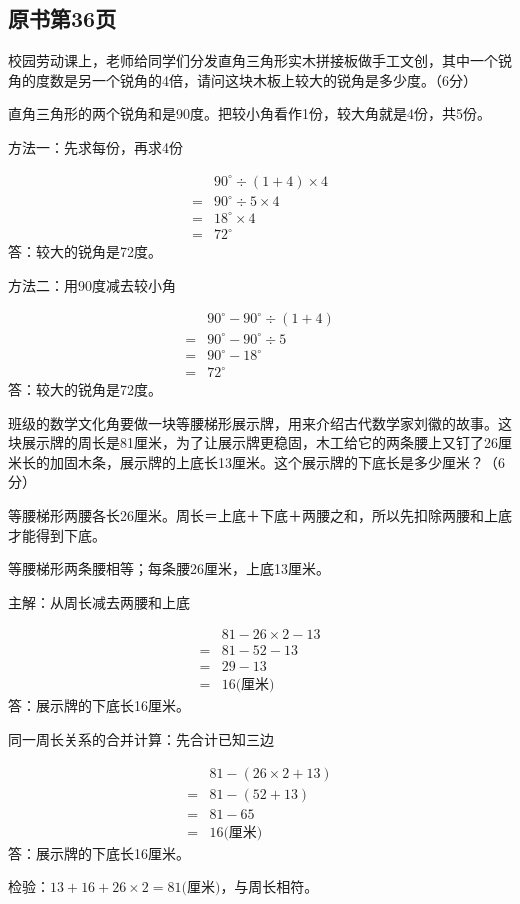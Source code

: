

\subsection*{原书第36页}

校园劳动课上，老师给同学们分发直角三角形实木拼接板做手工文创，其中一个锐角的度数是另一个锐角的4倍，请问这块木板上较大的锐角是多少度。（6分）\par
\begin{BookAnswer}
直角三角形的两个锐角和是90度。把较小角看作1份，较大角就是4份，共5份。\par 方法一：先求每份，再求4份\par \[\begin{aligned}&90^\circ\div(1+4)\times4\\={}&90^\circ\div5\times4\\={}&18^\circ\times4\\={}&72^\circ\end{aligned}\]答：较大的锐角是72度。\par 方法二：用90度减去较小角\par \[\begin{aligned}&90^\circ-90^\circ\div(1+4)\\={}&90^\circ-90^\circ\div5\\={}&90^\circ-18^\circ\\={}&72^\circ\end{aligned}\]答：较大的锐角是72度。
\end{BookAnswer}

班级的数学文化角要做一块等腰梯形展示牌，用来介绍古代数学家刘徽的故事。这块展示牌的周长是81厘米，为了让展示牌更稳固，木工给它的两条腰上又钉了26厘米长的加固木条，展示牌的上底长13厘米。这个展示牌的下底长是多少厘米？（6分）\par
{}
\begin{BookAnswer}
等腰梯形两腰各长26厘米。周长＝上底＋下底＋两腰之和，所以先扣除两腰和上底才能得到下底。\par 等腰梯形两条腰相等；每条腰26厘米，上底13厘米。\par 主解：从周长减去两腰和上底\par \[\begin{aligned} &81-26\times2-13\\={}&81-52-13\\={}&29-13\\={}&16\text{(厘米)}\end{aligned}\]答：展示牌的下底长16厘米。\par 同一周长关系的合并计算：先合计已知三边\par \[\begin{aligned} &81-(26\times2+13)\\={}&81-(52+13)\\={}&81-65\\={}&16\text{(厘米)}\end{aligned}\]答：展示牌的下底长16厘米。\par 检验：\(13+16+26\times2=81\text{(厘米)}\)，与周长相符。
\end{BookAnswer}

